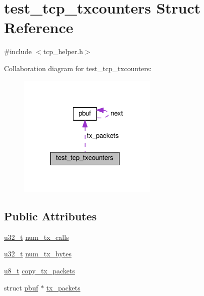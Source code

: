 \hypertarget{structtest__tcp__txcounters}{}\section{test\+\_\+tcp\+\_\+txcounters Struct Reference}
\label{structtest__tcp__txcounters}


{\ttfamily \#include $<$tcp\+\_\+helper.\+h$>$}



Collaboration diagram for test\+\_\+tcp\+\_\+txcounters\+:
\nopagebreak
\begin{figure}[H]
\begin{center}
\leavevmode
\includegraphics[width=189pt]{structtest__tcp__txcounters__coll__graph}
\end{center}
\end{figure}
\subsection*{Public Attributes}
\begin{DoxyCompactItemize}
\item 
\hyperlink{group__compiler__abstraction_ga4c14294869aceba3ef9d4c0c302d0f33}{u32\+\_\+t} \hyperlink{structtest__tcp__txcounters_a61b0361db9f1d20b1d35bc662da7ae4a}{num\+\_\+tx\+\_\+calls}
\item 
\hyperlink{group__compiler__abstraction_ga4c14294869aceba3ef9d4c0c302d0f33}{u32\+\_\+t} \hyperlink{structtest__tcp__txcounters_ae57b79f1ce0d06e87bf3870bb13eb4f9}{num\+\_\+tx\+\_\+bytes}
\item 
\hyperlink{group__compiler__abstraction_ga4caecabca98b43919dd11be1c0d4cd8e}{u8\+\_\+t} \hyperlink{structtest__tcp__txcounters_a5ed30ef06469ce08254074f94beada27}{copy\+\_\+tx\+\_\+packets}
\item 
struct \hyperlink{structpbuf}{pbuf} $\ast$ \hyperlink{structtest__tcp__txcounters_a9e8e4ba7e34d0fc4f9a839bd75832ead}{tx\+\_\+packets}
\end{DoxyCompactItemize}


